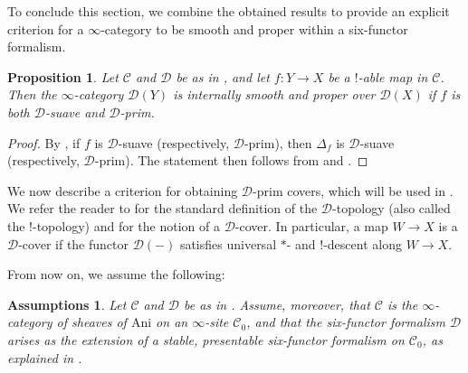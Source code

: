 \documentclass[oneside, hidelinks, 12pt, a4paper,reqno]{amsart}
\theoremstyle{plain}
\theoremstyle{definition}
\theoremstyle{plain}
\newtheorem{proposition}[proposition]{Proposition}
\newtheorem{assumptions}[assumptions]{Assumptions}
\newcommand{\cC}{\mathscr C}
\newcommand{\cD}{\mathscr D}
\newcommand{\cat}{$\infty$-category }
\begin{document}
To conclude this section, we combine the obtained results to provide an explicit criterion for a \cat to be smooth and proper within a six-functor formalism.

\begin{proposition}\label{prop: smooth and proper cat in 6 ff}
    Let $\cC$ and $\cD$ be as in , and let $f \colon Y \to X$ be a $!$-able map in $\cC$. Then the \cat $\cD(Y)$ is internally smooth and proper over $\cD(X)$ if $f$ is both $\cD$-suave and $\cD$-prim.
\end{proposition}

\begin{proof}
    By \cite[Lemma 4.5.9 (i)]{heyer20246functorformalismssmoothrepresentations}, if $f$ is $\cD$-suave (respectively, $\cD$-prim), then $\Delta_f$ is $\cD$-suave (respectively, $\cD$-prim). The statement then follows from  and .
\end{proof}

We now describe a criterion for obtaining $\mathscr{D}$-prim covers, which will be used in . We refer the reader to \cite{heyer20246functorformalismssmoothrepresentations} for the standard definition of the $\mathscr{D}$-topology (also called the $!$-topology) and for the notion of a $\mathscr{D}$-cover. In particular, a map $W \to X$ is a $\mathscr{D}$-cover if the functor $\mathscr{D}(-)$ satisfies universal $*$- and $!$-descent along $W \to X$.  

From now on, we assume the following:

\begin{assumptions}\label{assumpions 2}
    Let $\mathscr{C}$ and $\mathscr{D}$ be as in . Assume, moreover, that $\mathscr{C}$ is the \cat of sheaves of $\mathrm{Ani}$ on an $\infty$-site $\mathscr{C}_{0}$, and that the six-functor formalism $\mathscr{D}$ arises as the extension of a stable, presentable six-functor formalism on $\mathscr{C}_0$, as explained in \cite{heyer20246functorformalismssmoothrepresentations}.
\end{assumptions}
\end{document}
